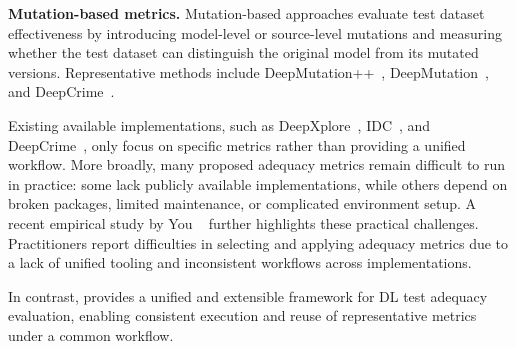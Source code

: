 \textbf{Mutation-based metrics.}
Mutation-based approaches evaluate test dataset effectiveness by introducing model-level or source-level mutations and measuring whether the test dataset can distinguish the original model from its mutated versions.
Representative methods include DeepMutation++~\cite{bib:hu2019deepmutation++}, DeepMutation~\cite{bib:ma2018deepmutation}, and DeepCrime~\cite{bib:humbatova2021deepcrime}.

Existing available implementations, such as DeepXplore~\cite{bib:pei2017deepxplore}, IDC~\cite{bib:dola2023input}, and DeepCrime~\cite{bib:humbatova2021deepcrime}, only focus on specific metrics rather than providing a unified workflow. More broadly, many proposed adequacy metrics remain difficult to run in practice: some lack publicly available implementations, while others depend on broken packages, limited maintenance, or complicated environment setup. A recent empirical study by You \etal~\cite{bib:you2025navigating} further highlights these practical challenges. Practitioners report difficulties in selecting and applying adequacy metrics due to a lack of unified tooling and inconsistent workflows across implementations.


In contrast, \tool provides a unified and extensible framework for DL test adequacy evaluation, enabling consistent execution and reuse of representative metrics under a common workflow.
